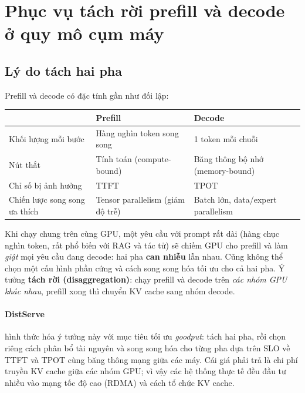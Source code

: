 
\section{Phục vụ tách rời prefill và decode ở quy mô cụm máy}
\label{sec:disaggregated_serving}

\subsection{Lý do tách hai pha}
\label{ssec:why_disaggregate}
Prefill và decode có đặc tính gần như đối lập:
\begin{center}
\begin{tabular}{@{}lll@{}}
\toprule
 & \textbf{Prefill} & \textbf{Decode} \\
\midrule
Khối lượng mỗi bước & Hàng nghìn token song song & 1 token mỗi chuỗi \\
Nút thắt & Tính toán (compute-bound) & Băng thông bộ nhớ (memory-bound) \\
Chỉ số bị ảnh hưởng & TTFT & TPOT \\
Chiến lược song song ưa thích & Tensor parallelism (giảm độ trễ) & Batch lớn, data/expert parallelism \\
\bottomrule
\end{tabular}
\end{center}
Khi chạy chung trên cùng GPU, một yêu cầu với prompt rất dài (hàng chục nghìn token, rất phổ biến với RAG và tác tử) sẽ chiếm GPU cho prefill và làm \emph{giật} mọi yêu cầu đang decode: hai pha \textbf{can nhiễu} lẫn nhau. Cũng không thể chọn một cấu hình phần cứng và cách song song hóa tối ưu cho cả hai pha. Ý tưởng \textbf{tách rời (disaggregation)}: chạy prefill và decode trên \emph{các nhóm GPU khác nhau}, prefill xong thì chuyển KV cache sang nhóm decode.

\paragraph{DistServe \cite{zhong2024distserve}} hình thức hóa ý tưởng này với mục tiêu tối ưu \emph{goodput}: tách hai pha, rồi chọn riêng cách phân bổ tài nguyên và song song hóa cho từng pha dựa trên SLO về TTFT và TPOT cùng băng thông mạng giữa các máy. Cái giá phải trả là chi phí truyền KV cache giữa các nhóm GPU; vì vậy các hệ thống thực tế đều đầu tư nhiều vào mạng tốc độ cao (RDMA) và cách tổ chức KV cache.

